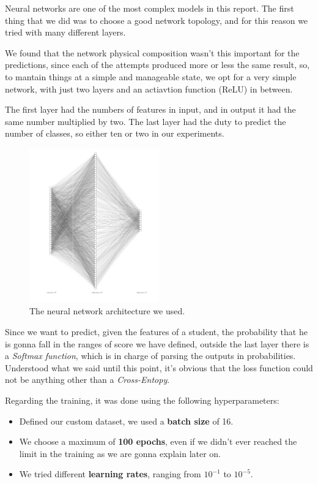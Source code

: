 \documentclass{article}
\begin{document}
Neural networks are one of the most complex models in this report.
The first thing that we did was to choose a good network topology, and for this reason we tried with many different layers.

We found that the network physical composition wasn't this important for the predictions, since each of the attempts produced more or less the same 
result, so, to mantain things at a simple and manageable state, we opt for a very simple network, with just two layers and an actiavtion function 
(ReLU) in between.

The first layer had the numbers of features in input, and in output it had the same number multiplied by two. The last layer had the duty
to predict the number of classes, so either ten or two in our experiments.

\begin{figure}
    \centering
    \includegraphics[width=0.5\textwidth]{nn_architecture.png}
    \caption{\label{fig:nn}The neural network architecture we used.}
\end{figure}

Since we want to predict, given the features of a student, the probability that he is gonna fall in the ranges of score we have defined, outside the last layer there is a \emph{Softmax function}, which is in charge
of parsing the outputs in probabilities. 
Understood what we said until this point, it's obvious that the loss function could not be anything other than a \emph{Cross-Entopy}.

Regarding the training, it was done using the following hyperparameters:

\begin{itemize}
    \item Defined our custom dataset, we used a \textbf{batch size} of 16.
    \item We choose a maximum of \textbf{100 epochs}, even if we didn't ever reached the limit in the training as we are gonna explain later on.
    \item We tried different \textbf{learning rates}, ranging from $10^{-1}$ to $10^{-5}$.
\end{itemize}
\end{document}
